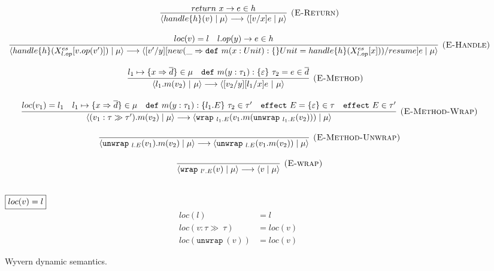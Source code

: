 \documentclass{article}
\newcommand{\keywadj}[1]{\mathtt{#1}}
\newcommand{\keyw}[1]{\keywadj{#1}~}
\begin{document}
\begin{figure}[H]
{\[\begin{array}{c}

\infer[\textsc{(E-Return)}]
  {\langle handle\{h\} (v) \mid \mu \rangle \longrightarrow \langle [v/x]e \mid \mu \rangle}
  {return\ x \rightarrow e \in h}\\[3ex]
  
  \infer[\textsc{(E-Handle)}]
  {\langle handle\{h\} (X^{es}_{l.op}[v.op(v')]) \mid \mu \rangle \longrightarrow \langle [v'/y][new(\_ \Rightarrow \keyw{def} m(x: Unit) : \{\} Unit = handle\{h\}(X_{l.op}^{es}[x]))/resume]e \mid \mu \rangle}
  {loc(v)=l & l.op(y) \rightarrow e \in h }\\[3ex]
  
  \infer[\textsc{(E-Method)}]
  { \langle l_1.m(v_2)~|~\mu \rangle \longrightarrow \langle [v_2/y][l_1/x]e~|~\mu \rangle}
  {   l_1 \mapsto \{ x \Rightarrow \overline{d} \} \in \mu & \keyw{def} m(y : \tau_1) : \{ \varepsilon \}~\tau_2 = e \in \overline{d}}\quad  \\[3ex]
  
  
\infer[\textsc{(E-Method-Wrap)}]
  {\langle (v_1 : \tau \gg \tau').m(v_2) \mid \mu \rangle \longrightarrow \langle \keyw{wrap}_{l_1.E}(v_1.m(\keyw{unwrap}_{l_1.E}(v_2))) \mid \mu \rangle }
  { loc(v_1) = l_1 & l_1 \mapsto \{ x \Rightarrow \overline{d} \} \in \mu & \keyw{def} m(y : \tau_1) : \{ l_1.E \}~\tau_2  \in \tau' & \keyw{effect} E = \{\varepsilon\} \in \tau &  \keyw{effect} E \in \tau'} \\[3ex]
  
  
\infer[\textsc{(E-Method-Unwrap)}]
  {\langle \keyw{unwrap}_{l.E}(v_1).m(v_2) \mid \mu \rangle \longrightarrow  \langle \keyw{unwrap}_{l.E}(v_1.m(v_2)) \mid \mu \rangle }
  {} \\[3ex]
  
  
  
  
\infer[\textsc{(E-wrap)}]
  {\langle \keyw{wrap}_{l'.E}(v) \mid \mu \rangle \longrightarrow \langle v \mid \mu \rangle}
  {} \\[3ex]
\end{array}
\]


\noindent$\fbox{$loc(v) = l$}$
\[
\begin{array}{cc}
loc(l) &= l\\
loc(v:\tau \gg\ \tau) &= loc(v)\\
loc(\keyw{unwrap}(v)) &= loc(v)
\end{array} 
\]
}
\caption{Wyvern dynamic semantics.}
\label{f-effects-dynamic-semantics}
\end{figure}
\end{document}
